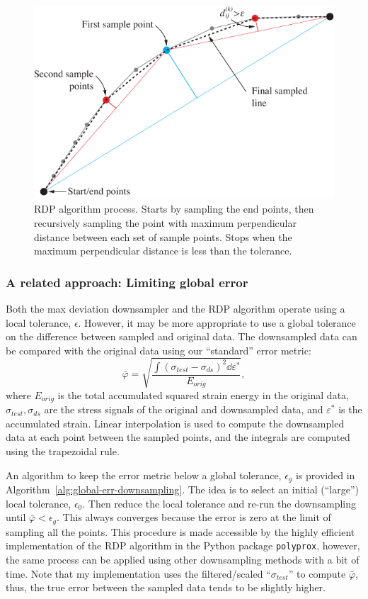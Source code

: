 \documentclass[a4paper,11pt]{article}
\begin{document}
\begin{figure}
    \centering
    \includegraphics[scale=1]{rdp_illustration.pdf}
    \caption{RDP algorithm process. Starts by sampling the end points, then recursively sampling the point with maximum perpendicular distance between each set of sample points. Stops when the maximum perpendicular distance is less than the tolerance.}
    \label{fig:rdp-algo}
\end{figure}

\subsubsection{A related approach: Limiting global error}

Both the max deviation downsampler and the RDP algorithm operate using a local tolerance, $\epsilon$.
However, it may be more appropriate to use a global tolerance on the difference between sampled and original data.
The downsampled data can be compared with the original data using our ``standard'' error metric:
\begin{equation}
    \bar{\varphi} = \sqrt{\frac{\int (\sigma_{test} - \sigma_{ds})^2 \dd \varepsilon^*}{E_{orig}}},
\end{equation}
where $E_{orig}$ is the total accumulated squared strain energy in the original data, $\sigma_{test}, \sigma_{ds}$ are the stress signals of the original and downsampled data, and $\varepsilon^*$ is the accumulated strain.
Linear interpolation is used to compute the downsampled data at each point between the sampled points, and the integrals are computed using the trapezoidal rule.

An algorithm to keep the error metric below a global tolerance, $\epsilon_g$ is provided in Algorithm~\ref{alg:global-err-downsampling}.
The idea is to select an initial (``large'') local tolerance, $\epsilon_0$.
Then reduce the local tolerance and re-run the downsampling until $\bar{\varphi} < \epsilon_{g}$.
This always converges because the error is zero at the limit of sampling all the points.
This procedure is made accessible by the highly efficient implementation of the RDP algorithm in the Python package \texttt{polyprox}, however, the same process can be applied using other downsampling methods with a bit of time.
Note that my implementation uses the filtered/scaled ``$\sigma_{test}$'' to compute $\bar{\varphi}$, thus, the true error between the sampled data tends to be slightly higher.
\end{document}
